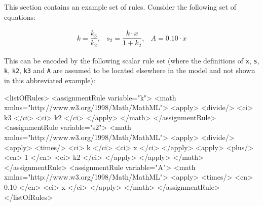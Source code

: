 This section contains an example set of rules.  Consider the
following set of equations:
\begin{linenomath}
  \begin{equation*}
    \begin{array}{lll}
      k = \dfrac{k_3}{k_2}, & s_2 = \dfrac{k \cdot x}{1 + k_2}, & A = 0.10 \cdot x
    \end{array}
  \end{equation*}
\end{linenomath}
This can be encoded by the following scalar rule set (where the
definitions of \texttt{x}, \texttt{s}, \texttt{k}, \texttt{k2},
\texttt{k3} and \texttt{A} are assumed to be located elsewhere in
the model and not shown in this abbreviated example):

\begin{example}
    <listOfRules>
        <assignmentRule variable="k">
            <math xmlns="http://www.w3.org/1998/Math/MathML">
                <apply>
                    <divide/>
                    <ci> k3 </ci>
                    <ci> k2 </ci>
                </apply>
            </math>
        </assignmentRule>
        <assignmentRule variable="s2">
            <math xmlns="http://www.w3.org/1998/Math/MathML">
                <apply>
                    <divide/>
                    <apply>
                        <times/>
                        <ci> k </ci>
                        <ci> x </ci>
                    </apply>
                    <apply>
                        <plus/>
                        <cn> 1 </cn>
                        <ci> k2 </ci>
                    </apply>
                </apply>
            </math>
        </assignmentRule>
        <assignmentRule variable="A">
            <math xmlns="http://www.w3.org/1998/Math/MathML">
                <apply>
                    <times/>
                    <cn> 0.10 </cn>
                    <ci> x </ci>
                </apply>
            </math>
        </assignmentRule>
    </listOfRules>
\end{example}


